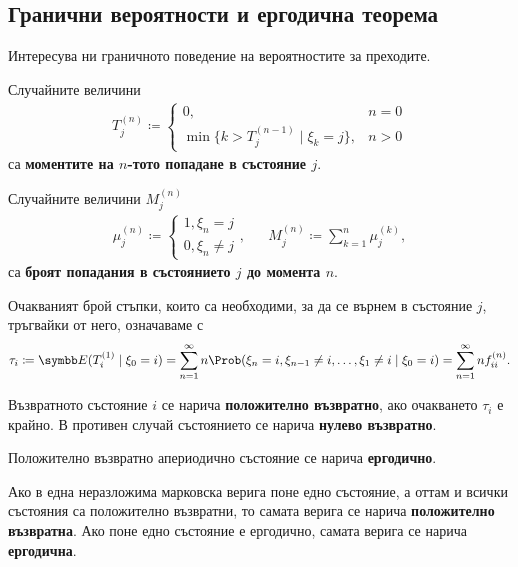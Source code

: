 \documentclass[numbers=endperiod, bibliography=totocnumbered]{scrartcl}
\begin{document}
\subsection{Гранични вероятности и ергодична теорема}

Интересува ни граничното поведение на вероятностите за преходите.

\begin{definition}
  Случайните величини
  \begin{align*}
    T_j^{(n)}
    \coloneqq
    \begin{cases}
      0, &n = 0 \\
      \min \{ k > T_j^{(n-1)} \mid \xi_k = j \}, &n > 0
    \end{cases}
  \end{align*}
  са \textbf{моментите на \( n \)-тото попадане в състояние \( j \)}.

  Случайните величини \( M_j^{(n)} \)
  \begin{align*}
    \mu_j^{(n)}
    \coloneqq
    \begin{cases}
      1, \xi_n = j \\
      0, \xi_n \neq j
    \end{cases},
    &&
    M_j^{(n)}
    \coloneqq
    \sum_{k=1}^n \mu_j^{(k)},
  \end{align*}
  са \textbf{броят попадания в състоянието \( j \) до момента \( n \)}.

  Очакваният брой стъпки, които са необходими, за да се върнем в състояние \( j \), тръгвайки от него, означаваме с
  \begin{equation*}
    \tau_i
    \coloneqq
    \Expect(T_i^{(1)} \mid \xi_0 = i)
    =
    \sum_{n=1}^\infty n \Prob(\xi_n = i, \xi_{n-1} \neq i, \ldots, \xi_1 \neq i \mid \xi_0 = i)
    =
    \sum_{n=1}^\infty n f^{(n)}_{ii}.
  \end{equation*}
\end{definition}

\begin{definition}
  Възвратното състояние \( i \) се нарича \textbf{положително възвратно}, ако очакването \( \tau_i \) е крайно. В противен случай състоянието се нарича \textbf{нулево възвратно}.

  Положително възвратно апериодично състояние се нарича \textbf{ергодично}.

  Ако в една неразложима марковска верига поне едно състояние, а оттам и всички състояния са положително възвратни, то самата верига се нарича \textbf{положително възвратна}. Ако поне едно състояние е ергодично, самата верига се нарича \textbf{ергодична}.
\end{definition}
\end{document}
